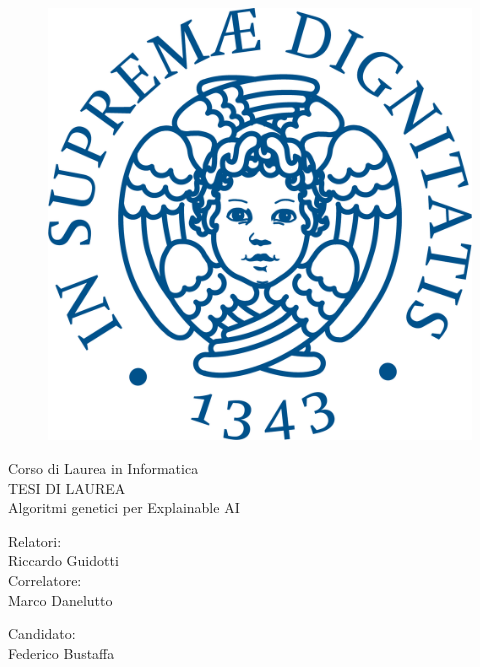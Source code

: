 \documentclass[12pt]{report}
\begin{document}
\begin{titlepage}
  \begin{figure}
    \centering\includegraphics[scale=0.5]{immagini/cherubino_pant541.png}
  \end{figure}

  \begin{center}
    {\LARGE{ Corso di Laurea in Informatica \\ }}
    \vspace{2cm}
    {\Large { TESI DI LAUREA }}\\
    \vspace{2cm}
    {\Large { Algoritmi genetici per Explainable AI }}
  \end{center}

  \vspace{2cm}

  \begin{minipage}[t]{0.47\textwidth}
    {\large{Relatori:\\ Riccardo Guidotti}}
    \vspace{0.5cm}
    {\large{\\Correlatore:\\ Marco Danelutto}}
  \end{minipage}\hfill\begin{minipage}[t]{0.47\textwidth}\raggedleft
    {\large{Candidato: \\ Federico Bustaffa\\ }}
  \end{minipage}

  \vspace{25mm}

\end{titlepage}
\end{document}
